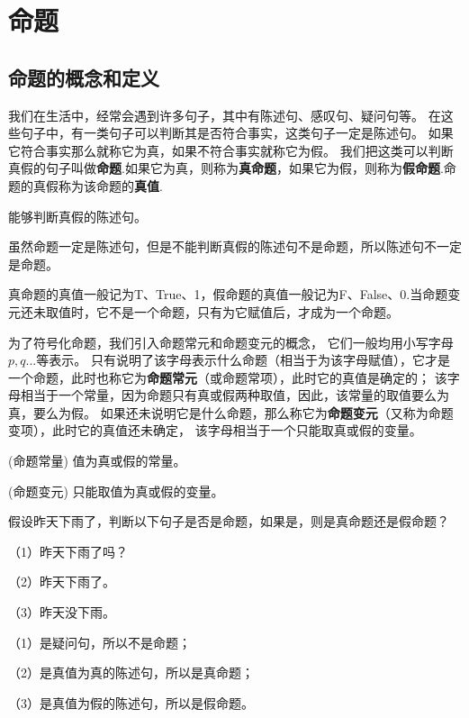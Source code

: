 \section{命题}
\subsection{命题的概念和定义}
我们在生活中，经常会遇到许多句子，其中有陈述句、感叹句、疑问句等。
在这些句子中，有一类句子可以判断其是否符合事实，这类句子一定是陈述句。
如果它符合事实那么就称它为真，如果不符合事实就称它为假。
我们把这类可以判断真假的句子叫做\textbf{命题}.如果它为真，则称为\textbf{真命题}，如果它为假，则称为\textbf{假命题}.命题的真假称为该命题的\textbf{真值}.

\begin{definition}[命题]
    能够判断真假的陈述句。
\end{definition}

虽然命题一定是陈述句，但是不能判断真假的陈述句不是命题，所以陈述句不一定是命题。

真命题的真值一般记为T、True、1，假命题的真值一般记为F、False、0.当命题变元还未取值时，它不是一个命题，只有为它赋值后，才成为一个命题。

为了符号化命题，我们引入命题常元和命题变元的概念，
它们一般均用小写字母$p,q...$等表示。
只有说明了该字母表示什么命题（相当于为该字母赋值），它才是一个命题，此时也称它为\textbf{命题常元}（或命题常项），此时它的真值是确定的；
该字母相当于一个常量，因为命题只有真或假两种取值，因此，该常量的取值要么为真，要么为假。
如果还未说明它是什么命题，那么称它为\textbf{命题变元}（又称为命题变项），此时它的真值还未确定，
该字母相当于一个只能取真或假的变量。

\begin{definition}(命题常量)
    值为真或假的常量。
\end{definition}
\begin{definition}(命题变元)
    只能取值为真或假的变量。
\end{definition}

\begin{example}
    假设昨天下雨了，判断以下句子是否是命题，如果是，则是真命题还是假命题？

    （1）昨天下雨了吗？

    （2）昨天下雨了。
    
    （3）昨天没下雨。
\end{example}
\begin{solution}
    （1）是疑问句，所以不是命题；
    
    （2）是真值为真的陈述句，所以是真命题；

    （3）是真值为假的陈述句，所以是假命题。
\end{solution}

